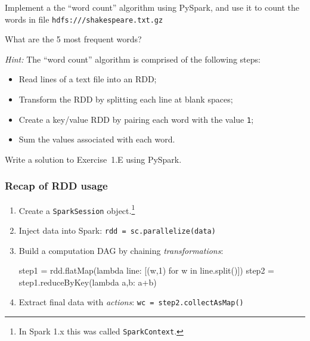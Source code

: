 \documentclass[english,serif,mathserif]{beamer}
\begin{document}
\begin{frame}
  \small

  \begin{exercise*}[2.D]
    Implement a the ``word count'' algorithm using PySpark, and use it
    to count the words in file \texttt{hdfs:///shakespeare.txt.gz}

    \+
    What are the 5 most frequent words?

    \+ \smaller
    \emph{Hint:} The ``word count'' algorithm is comprised of the
    following steps:
    \begin{itemize}
    \item Read lines of a text file into an RDD;
    \item Transform the RDD by splitting each line at blank spaces;
    \item Create a key/value RDD by pairing each word with the value \texttt{1};
    \item Sum the values associated with each word.
    \end{itemize}

  \end{exercise*}

  \+
  \begin{exercise*}[2.E]
    Write a solution to Exercise~1.E using PySpark.
  \end{exercise*}
\end{frame}


\begin{frame}[fragile]
  \frametitle{Recap of RDD usage}
  \begin{enumerate}
  \item Create a \texttt{SparkSession} object.\footnote{%
      \smaller
      In Spark 1.x this was called \texttt{SparkContext}.
    }%
  \item Inject data into Spark:
    \lstinline|rdd = sc.parallelize(data)|
  \item Build a computation DAG by chaining \emph{transformations}:
    \begin{python}
step1 = rdd.flatMap(lambda line:
            [(w,1) for w in line.split()])
step2 = step1.reduceByKey(lambda a,b: a+b)
    \end{python}
  \item Extract final data with \emph{actions}:
    \lstinline|wc = step2.collectAsMap()|
  \end{enumerate}
\end{frame}
\end{document}
